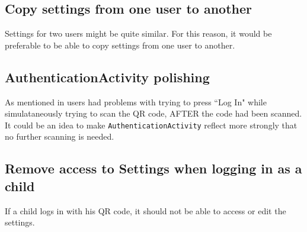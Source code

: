 \subsection{Copy settings from one user to another}
Settings for two users might be quite similar.
For this reason, it would be preferable to be able to copy settings from one user to another.                                                                                   
                                                                                   
\subsection{AuthenticationActivity polishing}

As mentioned in  users had problems with trying to press ``Log In" while simulataneously trying to scan the QR code, AFTER the code had been scanned.
It could be an idea to make \lstinline!AuthenticationActivity! reflect more strongly that no further scanning is needed.

\subsection{Remove access to Settings when logging in as a child}

If a child logs in with his QR code, it should not be able to access or edit the settings.